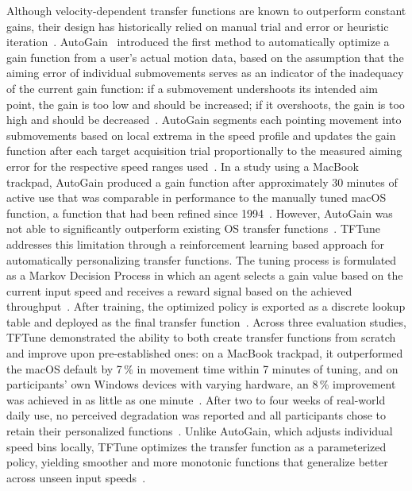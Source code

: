 Although velocity-dependent transfer functions are known to outperform constant gains, their design has historically relied on manual trial and error or heuristic iteration~\cite{lee2020autogain}. AutoGain~\cite{lee2020autogain} introduced the first method to automatically optimize a gain function from a user's actual motion data, based on the assumption that the aiming error of individual submovements serves as an indicator of the inadequacy of the current gain function: if a submovement undershoots its intended aim point, the gain is too low and should be increased; if it overshoots, the gain is too high and should be decreased~\cite{lee2020autogain}. AutoGain segments each pointing movement into submovements based on local extrema in the speed profile and updates the gain function after each target acquisition trial proportionally to the measured aiming error for the respective speed ranges used~\cite{lee2020autogain}. In a study using a MacBook trackpad, AutoGain produced a gain function after approximately 30 minutes of active use that was comparable in performance to the manually tuned macOS function, a function that had been refined since 1994~\cite{lee2020autogain}. However, AutoGain was not able to significantly outperform existing OS transfer functions~\cite{eddy2026tftune}. TFTune addresses this limitation through a reinforcement learning based approach for automatically personalizing transfer functions. The tuning process is formulated as a Markov Decision Process in which an agent selects a gain value based on the current input speed and receives a reward signal based on the achieved throughput~\cite{eddy2026tftune}. After training, the optimized policy is exported as a discrete lookup table and deployed as the final transfer function~\cite{eddy2026tftune}. Across three evaluation studies, TFTune demonstrated the ability to both create transfer functions from scratch and improve upon pre-established ones: on a MacBook trackpad, it outperformed the macOS default by 7\,\% in movement time within 7 minutes of tuning, and on participants' own Windows devices with varying hardware, an 8\,\% improvement was achieved in as little as one
minute~\cite{eddy2026tftune}. After two to four weeks of real-world daily use, no perceived degradation was reported and all participants chose to retain their personalized functions~\cite{eddy2026tftune}. Unlike AutoGain, which adjusts individual speed bins locally, TFTune optimizes the transfer function as a parameterized policy, yielding smoother and more monotonic functions that generalize better across unseen input speeds~\cite{eddy2026tftune}.

